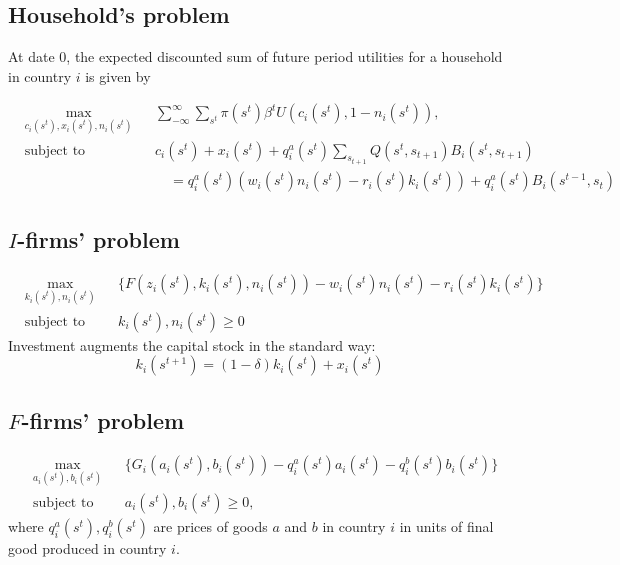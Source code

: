 \documentclass[11pt,a4paper]{article}
\begin{document}
\subsection{Household's problem}
At date 0, the expected discounted sum of future period utilities for a household in country $i$ is given by

\begin{equation*}
 \begin{aligned}
 & \underset{c_i(s^t),x_i(s^{t}),n_i(s^t)}{\text{max}}
 & & \sum^\infty_{-\infty}\sum_{s^t}\pi(s^t)\beta^t U(c_i(s^t),1-n_i(s^t)), \\
 & \text{subject to}
 & &  c_i(s^t) +x_i(s^t)+q_i^a(s^t)\sum_{s_{t+1}}Q(s^t,s_{t+1})B_i(s^t,s_{t+1})\\
 &&&\quad =q_i^a(s^t)(w_i(s^t)n_i(s^t)-r_i(s^t)k_i(s^t))+q_i^a(s^t)B_i(s^{t-1},s_t)
 \end{aligned}
\end{equation*}

\subsection{$I$-firms' problem} 

\begin{equation*}
 \begin{aligned}
 & \underset{k_i(s^t),n_i(s^t)}{\text{max}}
 & & \{F(z_i(s^t),k_i(s^t),n_i(s^t))-w_i(s^t)n_i(s^t)-r_i(s^t)k_i(s^t)\} \\
 & \text{subject to}
 & & k_i(s^t),n_i(s^t)\geq 0
 \end{aligned}
\end{equation*}
Investment augments the capital stock in the standard way:
\begin{equation}
k_i(s^{t+1})=(1-\delta)k_i(s^t)+x_i(s^t)
\end{equation}


\subsection{$F$-firms' problem}
\begin{equation*}
 \begin{aligned}
 & \underset{a_i(s^t),b_i(s^t)}{\text{max}}
 & & \{G_i(a_i(s^t),b_i(s^t))-q_i^a(s^t)a_i(s^t)-q_i^b(s^t)b_i(s^t)\} \\
 & \text{subject to}
 & & a_i(s^t),b_i(s^t) \geq 0,
 \end{aligned}
\end{equation*}
where $q_i^a(s^t),q_i^b(s^t)$ are prices of goods $a$ and $b$ in country $i$ in units of final good produced in country $i$.
\end{document}
